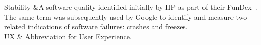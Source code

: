 \begin{longtabu}
Stability &A software quality identified initially by HP as part of their FunDex~\citep{calleosoftware_AppPulseMobile}. The same term was subsequently used by Google to identify and measure two related indications of software failures: crashes and freezes. \\ %

UX & Abbreviation for User Experience. \\

\caption{Glossary with Abbreviations} \\
\end{longtabu}







\clearpage